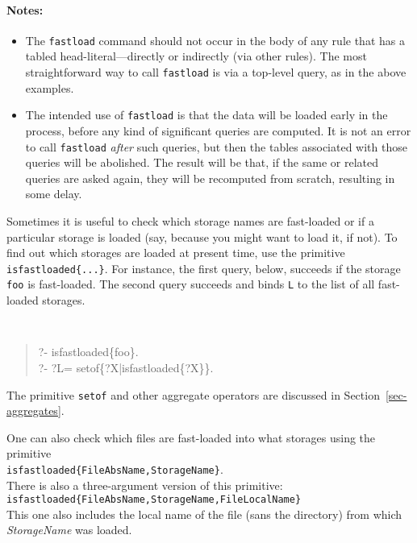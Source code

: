 \paragraph{Notes:}
\begin{itemize}
\item  The \texttt{fastload} command should not occur in the body of any
  rule that has a tabled head-literal---directly or indirectly (via other
  rules). The most straightforward way to call \texttt{fastload} is via a
  top-level query, as in the above examples. 
\item The intended use of \texttt{fastload} is that the data will be loaded
  early in the process, before any kind of significant queries are
  computed. It is not an error to call \texttt{fastload} \emph{after} such
  queries, but then the tables associated with those
  queries will be abolished. The result will be that, if the same or related
  queries are asked again, they will be recomputed from scratch,
  resulting in some delay. 
\end{itemize}


Sometimes it is useful to check which storage names are fast-loaded or if a
particular storage is loaded (say, because you might want to load it,
if not).  To find out which storages are loaded at present time, use the
primitive {\tt isfastloaded\{...\}}. For instance, the first query,
below, succeeds if the storage {\tt foo} is fast-loaded. The second query
succeeds and binds {\tt L} to the list of all fast-loaded storages.
{\tt
\begin{quote}
 ?- isfastloaded\{foo\}.\\
 ?- ?L= setof\{?X|isfastloaded\{?X\}\}.
\end{quote}
}
\noindent
The primitive
\texttt{setof} and other aggregate operators are discussed in
Section~\ref{sec-aggregates}.

One can also check which files are fast-loaded into what storages using the
primitive\\
\texttt{isfastloaded\{FileAbsName,StorageName\}}.
\\
There is also a three-argument version of this primitive:
\\
\texttt{isfastloaded\{FileAbsName,StorageName,FileLocalName\}}
\\
This one
also includes the local name of the file (sans the directory)
from which \emph{StorageName} was loaded. 


